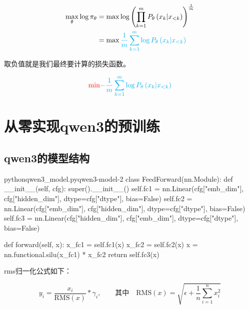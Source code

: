 \documentclass[lang=cn,newtx,10pt,scheme=chinese]{elegantbook}
\begin{document}
\begin{equation}
\begin{aligned}
\max_\theta\log\pi_\theta &= \max\log\left( \prod_{k=1}^{m}P_\theta\left( x_k|x_{<k} \right) \right)^{\frac{1}{m}} \\
&= \max{\color{cyan}\frac{1}{m}\sum_{k=1}^{m}\log P_\theta\left( x_k|x_{<k} \right)}
\end{aligned}
\end{equation}

取负值就是我们最终要计算的损失函数。

\begin{equation}
{\color{red}\min}{\color{cyan}-\frac{1}{m}\sum_{k=1}^{m}\log P_\theta\left( x_k|x_{<k} \right)}
\end{equation}

\section{从零实现qwen3的预训练}

\subsection{qwen3的模型结构}

\begin{codebox}{python}{qwen3\_model.py}{qwen3-model-2}
class FeedForward(nn.Module):
    def __init__(self, cfg):
        super().__init__()
        self.fc1 = nn.Linear(cfg["emb_dim"], cfg["hidden_dim"], dtype=cfg["dtype"], bias=False)
        self.fc2 = nn.Linear(cfg["emb_dim"], cfg["hidden_dim"], dtype=cfg["dtype"], bias=False)
        self.fc3 = nn.Linear(cfg["hidden_dim"], cfg["emb_dim"], dtype=cfg["dtype"], bias=False)

    def forward(self, x):
        x_fc1 = self.fc1(x)
        x_fc2 = self.fc2(x)
        x = nn.functional.silu(x_fc1) * x_fc2
        return self.fc3(x)
\end{codebox}

rms归一化公式如下：

\begin{equation}
y_i = \frac{x_i}{\text{RMS}(x)} * \gamma_i, \quad\quad\text{其中}\quad\text{RMS}(x)=\sqrt{\epsilon+\frac{1}{n}\sum_{i=1}^{n}x_i^2}
\end{equation}
\end{document}
